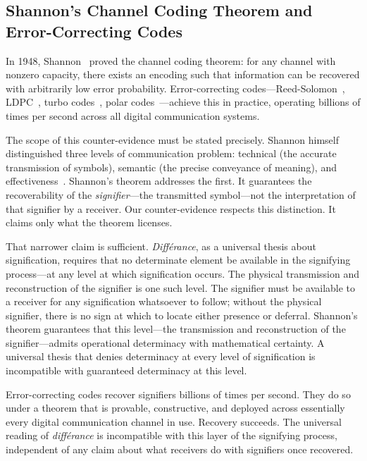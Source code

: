 \documentclass[a4paper,twocolumn,11pt]{article}
\begin{document}
\subsection{Shannon's Channel Coding Theorem and Error-Correcting Codes}
\label{sec:shannon}

In 1948, Shannon~\cite{Shannon1948} proved the channel coding theorem: for any channel with nonzero capacity, there exists an encoding such that information can be recovered with arbitrarily low error probability. Error-correcting codes---Reed-Solomon~\cite{ReedSolomon1960}, LDPC~\cite{Gallager1962}, turbo codes~\cite{Berrou1993}, polar codes~\cite{Arikan2009}---achieve this in practice, operating billions of times per second across all digital communication systems.

The scope of this counter-evidence must be stated precisely. Shannon himself distinguished three levels of communication problem: technical (the accurate transmission of symbols), semantic (the precise conveyance of meaning), and effectiveness~\cite{ShannonWeaver1949}. Shannon's theorem addresses the first. It guarantees the recoverability of the \emph{signifier}---the transmitted symbol---not the interpretation of that signifier by a receiver. Our counter-evidence respects this distinction. It claims only what the theorem licenses.

That narrower claim is sufficient. \emph{Diff\'erance}, as a universal thesis about signification, requires that no determinate element be available in the signifying process---at any level at which signification occurs. The physical transmission and reconstruction of the signifier is one such level. The signifier must be available to a receiver for any signification whatsoever to follow; without the physical signifier, there is no sign at which to locate either presence or deferral. Shannon's theorem guarantees that this level---the transmission and reconstruction of the signifier---admits operational determinacy with mathematical certainty. A universal thesis that denies determinacy at every level of signification is incompatible with guaranteed determinacy at this level.

Error-correcting codes recover signifiers billions of times per second. They do so under a theorem that is provable, constructive, and deployed across essentially every digital communication channel in use. Recovery succeeds. The universal reading of \emph{diff\'erance} is incompatible with this layer of the signifying process, independent of any claim about what receivers do with signifiers once recovered.
\end{document}
